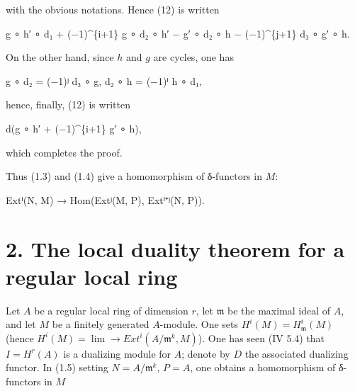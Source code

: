 \documentclass[
  11pt,
  a4paper,
]{book}
\newenvironment{Shaded}{}{}
\newcommand{\NormalTok}[1]{#1}
\begin{document}
with the obvious notations. Hence (12) is written

\begin{Shaded}
\begin{Highlighting}[]
\NormalTok{g ∘ h′ ∘ d₁ + (−1)\^{}\{i+1\} g ∘ d₂ ∘ h′ − g′ ∘ d₂ ∘ h − (−1)\^{}\{j+1\} d₃ ∘ g′ ∘ h.}
\end{Highlighting}
\end{Shaded}

On the other hand, since \(h\) and \(g\) are cycles, one has

\begin{Shaded}
\begin{Highlighting}[]
\NormalTok{g ∘ d₂ = (−1)ʲ d₃ ∘ g,}
\NormalTok{d₂ ∘ h = (−1)ⁱ h ∘ d₁,}
\end{Highlighting}
\end{Shaded}

hence, finally, (12) is written

\begin{Shaded}
\begin{Highlighting}[]
\NormalTok{d(g ∘ h′ + (−1)\^{}\{i+1\} g′ ∘ h),}
\end{Highlighting}
\end{Shaded}

which completes the proof.

Thus (1.3) and (1.4) give a homomorphism of δ-functors in \(M\):

\begin{Shaded}
\begin{Highlighting}[]
\NormalTok{Extⁱ(N, M) → Hom(Extʲ(M, P), Extⁱ⁺ʲ(N, P)).}
\end{Highlighting}
\end{Shaded}

\section{2. The local duality theorem for a regular local
ring}\label{the-local-duality-theorem-for-a-regular-local-ring}

Let \(A\) be a regular local ring of dimension \(r\), let
\(\mathfrak{m}\) be the maximal ideal of \(A\), and let \(M\) be a
finitely generated \(A\)-module. One sets
\(H^{i}(M) = H^{i}_{\mathfrak{m}}(M)\) (hence \(H^{i}(M) = \lim\to
Ext^{i}(A/\mathfrak{m}^{k}, M)\)). One has seen (IV 5.4) that
\(I = H^{r}(A)\) is a dualizing module for \(A\); denote by \(D\) the
associated dualizing functor. In (1.5) setting
\(N = A/\mathfrak{m}^{k}\), \(P = A\), one obtains a homomorphism of
δ-functors in \(M\)
\end{document}

